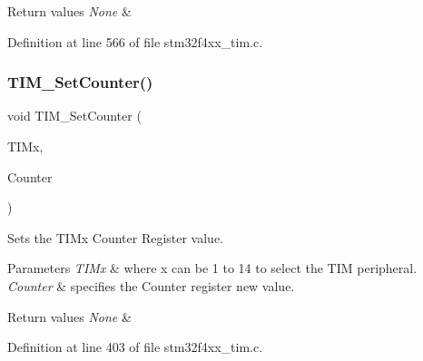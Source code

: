 \begin{DoxyRetVals}{Return values}
{\em None} & \\
\hline
\end{DoxyRetVals}


Definition at line 566 of file stm32f4xx\+\_\+tim.\+c.

\mbox{\label{group___t_i_m___group1_ga18173e7955a85d5c2598c643eada2692}} 
\subsubsection{\texorpdfstring{T\+I\+M\+\_\+\+Set\+Counter()}{TIM\_SetCounter()}}
{\footnotesize\ttfamily void T\+I\+M\+\_\+\+Set\+Counter (\begin{DoxyParamCaption}\item[{\hyperlink{struct_t_i_m___type_def}{T\+I\+M\+\_\+\+Type\+Def} $\ast$}]{T\+I\+Mx,  }\item[{uint32\+\_\+t}]{Counter }\end{DoxyParamCaption})}



Sets the T\+I\+Mx Counter Register value. 


\begin{DoxyParams}{Parameters}
{\em T\+I\+Mx} & where x can be 1 to 14 to select the T\+IM peripheral. \\
\hline
{\em Counter} & specifies the Counter register new value. \\
\hline
\end{DoxyParams}

\begin{DoxyRetVals}{Return values}
{\em None} & \\
\hline
\end{DoxyRetVals}


Definition at line 403 of file stm32f4xx\+\_\+tim.\+c.

\mbox{\label{group___t_i_m___group1_ga83fd58c9416802d9638bbe1715c98932}} 
